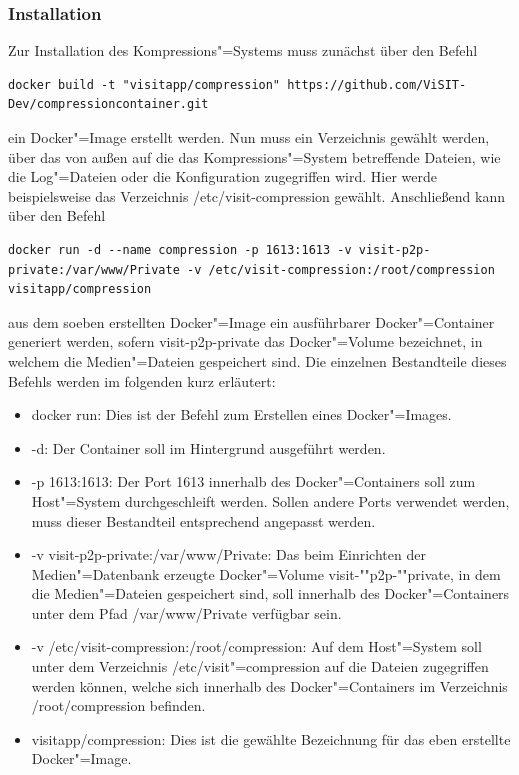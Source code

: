\subsubsection{Installation}

Zur Installation des Kompressions"=Systems muss zunächst über den Befehl 
\begin{lstlisting}[caption=Befehl zum Erstellen des Docker-Images]
docker build -t "visitapp/compression" https://github.com/ViSIT-Dev/compressioncontainer.git
\end{lstlisting}
ein Docker"=Image erstellt werden. Nun muss ein Verzeichnis gewählt werden, über das von außen auf die das Kompressions"=System betreffende Dateien, wie die Log"=Dateien oder die Konfiguration zugegriffen wird. Hier werde beispielsweise das Verzeichnis {\ttfamily /etc/visit-compression} gewählt. Anschließend kann über den Befehl
\begin{lstlisting}[caption=Befehl zum Erstellen des Docker-Containers]
docker run -d --name compression -p 1613:1613 -v visit-p2p-private:/var/www/Private -v /etc/visit-compression:/root/compression visitapp/compression
\end{lstlisting}
aus dem soeben erstellten Docker"=Image ein ausführbarer Docker"=Container generiert werden, sofern {visit-p2p-private} das Docker"=Volume bezeichnet, in welchem die Medien"=Dateien gespeichert sind. Die einzelnen Bestandteile dieses Befehls werden im folgenden kurz erläutert:
\begin{itemize}
\item {\ttfamily docker run}: Dies ist der Befehl zum Erstellen eines Docker"=Images.
\item {\ttfamily -d}: Der Container soll im Hintergrund ausgeführt werden.
\item {\ttfamily -p 1613:1613}: Der Port 1613 innerhalb des Docker"=Containers soll zum Host"=System durchgeschleift werden. Sollen andere Ports verwendet werden, muss dieser Bestandteil entsprechend angepasst werden.
\item {\ttfamily -v visit-p2p-private:/var/www/Private}: Das beim Einrichten der Medien"=Datenbank erzeugte Docker"=Volume {\ttfamily visit-""p2p-""private}, in dem die Medien"=Dateien gespeichert sind, soll innerhalb des Docker"=Containers unter dem Pfad {\ttfamily /var/www/Private} verfügbar sein.
\item {\ttfamily -v /etc/visit-compression:/root/compression}: Auf dem Host"=System soll unter dem Verzeichnis {\ttfamily /etc/visit"=compression} auf die Dateien zugegriffen werden können, welche sich innerhalb des Docker"=Containers im Verzeichnis {\ttfamily /root/compression} befinden.
\item {\ttfamily visitapp/compression}: Dies ist die gewählte Bezeichnung für das eben erstellte Docker"=Image.
\end{itemize}
